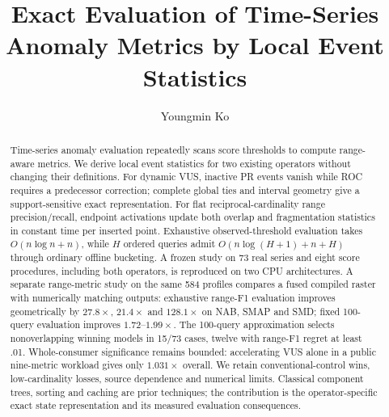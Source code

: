 \documentclass[sigconf,nonacm]{acmart}
\begin{document}
\title{Exact Evaluation of Time-Series Anomaly Metrics by Local Event Statistics}
\author{Youngmin Ko}
\begin{abstract}
Time-series anomaly evaluation repeatedly scans score thresholds to compute range-aware metrics. We derive local event statistics for two existing operators without changing their definitions. For dynamic VUS, inactive PR events vanish while ROC requires a predecessor correction; complete global ties and interval geometry give a support-sensitive exact representation. For flat reciprocal-cardinality range precision/recall, endpoint activations update both overlap and fragmentation statistics in constant time per inserted point. Exhaustive observed-threshold evaluation takes $O(n\log n+n)$, while $H$ ordered queries admit $O(n\log(H+1)+n+H)$ through ordinary offline bucketing. A frozen study on 73 real series and eight score procedures, including both operators, is reproduced on two CPU architectures. A separate range-metric study on the same 584 profiles compares a fused compiled raster with numerically matching outputs: exhaustive range-F1 evaluation improves geometrically by $27.8\times$, $21.4\times$ and $128.1\times$ on NAB, SMAP and SMD; fixed 100-query evaluation improves $1.72$--$1.99\times$. The 100-query approximation selects nonoverlapping winning models in 15/73 cases, twelve with range-F1 regret at least .01. Whole-consumer significance remains bounded: accelerating VUS alone in a public nine-metric workload gives only $1.031\times$ overall. We retain conventional-control wins, low-cardinality losses, source dependence and numerical limits. Classical component trees, sorting and caching are prior techniques; the contribution is the operator-specific exact state representation and its measured evaluation consequences.
\end{abstract}
\maketitle
\vldbtopmatter



\end{document}
